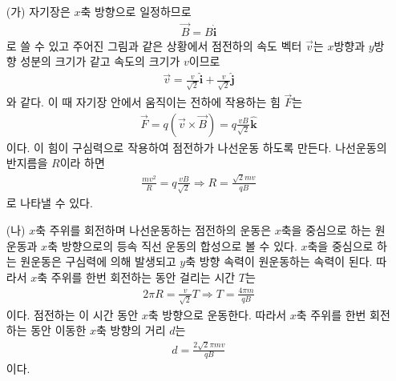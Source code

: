 \documentclass[tightenlines,floatfix,nofootinbib,superscriptaddress,fleqn]{revtex4}
\begin{document}
\begin{itemize}
  \item[(가)] 자기장은 $x$축 방향으로 일정하므로 
  \begin{align}
    \vec{B} = B\hat{\bm i}
  \end{align}
  로 쓸 수 있고 주어진 그림과 같은 상황에서 점전하의 속도 벡터 $\vec{v}$는 
  $x$방향과 $y$방향 성분의 크기가 같고 속도의 크기가 $v$이므로
  \begin{align}
    \vec{v} = \frac{v}{\sqrt{2}}\hat{\bm i}+\frac{v}{\sqrt{2}}\hat{\bm j}
  \end{align}
  와 같다. 이 때 자기장 안에서 움직이는 전하에 작용하는 힘 $\vec{F}$는
  \begin{align}
    \vec{F} = q\left(\vec{v}\times \vec{B}\right) = q\frac{vB}{\sqrt{2}}\hat{\bm k}
  \end{align}
  이다. 이 힘이 구심력으로 작용하여 점전하가 나선운동 하도록 만든다. 나선운동의 반지름을 
  $R$이라 하면
  \begin{align}
    \frac{mv^2}{R} = q\frac{vB}{\sqrt{2}}\Longrightarrow
    R = \frac{\sqrt{2}mv}{qB}
  \end{align}
  로 나타낼 수 있다.
  \item[(나)] $x$축 주위를 회전하며 나선운동하는 점전하의 운동은 $x$축을 중심으로 하는 
  원운동과 $x$축 방향으로의 등속 직선 운동의 합성으로 볼 수 있다. $x$축을 중심으로 하는 
  원운동은 구심력에 의해 발생되고 $y$축 방향 속력이 원운동하는 속력이 된다. 따라서
  $x$축 주위를 한번 회전하는 동안 걸리는 시간 $T$는
  \begin{align}
   2\pi R = \frac{v}{\sqrt{2}}T\Longrightarrow T = \frac{4\pi m}{qB} 
  \end{align}
  이다. 점전하는 이 시간 동안 $x$축 방향으로 운동한다. 따라서 $x$축 주위를 한번 회전하는
  동안 이동한 $x$축 방향의 거리 $d$는
  \begin{align}
    d = \frac{2\sqrt{2}\pi mv}{qB} 
  \end{align}
  이다.

\end{itemize}
\end{document}
